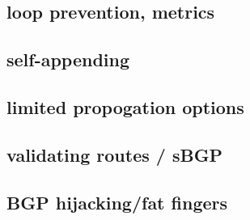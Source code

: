 \subsection{loop prevention, metrics}

\subsection{self-appending}

\subsection{limited propogation options}

\subsection{validating routes / sBGP}

\subsection{BGP hijacking/fat fingers}


